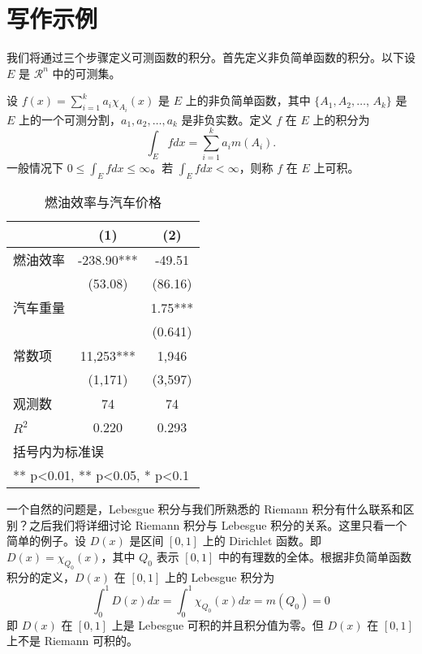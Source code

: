 \documentclass[cn,normal,12pt]{../elegantnote}
\begin{document}
\section{写作示例}

我们将通过三个步骤定义可测函数的积分。首先定义非负简单函数的积分。以下设 $E$ 是 $\mathcal{R}^n$ 中的可测集。

\begin{definition}[可积性]
设 $ f(x)=\sum\limits_{i=1}^{k} a_i \chi_{A_i}(x)$ 是 $E$ 上的非负简单函数，其中 $\{A_1,A_2,\ldots$, $A_k\}$ 是 $E$ 上的一个可测分割，$a_1,a_2,\ldots,a_k$ 是非负实数。定义 $f$ 在 $E$ 上的积分为
\begin{equation}
   \label{inter}
   \int_{E} f dx = \sum_{i=1}^k a_i m(A_i).
\end{equation}
一般情况下 $0 \leq \int_{E} f dx \leq \infty$。若 $\int_{E} f dx < \infty$，则称 $f$ 在 $E$ 上可积。
\end{definition}

\begin{table}[htbp]
  \small
  \centering
  \caption{燃油效率与汽车价格}
    \begin{tabular}{lcc}
    \toprule
                    &       (1)         &        (2)      \\
    \midrule
    燃油效率        &    -238.90***     &      -49.51     \\
                    &     (53.08)       &      (86.16)    \\
    汽车重量        &                   &        1.75***  \\
                    &                   &       (0.641)   \\
    常数项          &  11,253***        &    1,946       \\
                    &  (1,171)          &   (3,597)      \\
    观测数          &      74           &       74        \\
    $R^2$           &       0.220       &        0.293    \\
    \bottomrule
    \multicolumn{3}{l}{\scriptsize 括号内为标准误} \\
    \multicolumn{3}{l}{\scriptsize *** p<0.01, ** p<0.05, * p<0.1} \\
    \end{tabular}%
  \label{tab:reg}%
\end{table}%

一个自然的问题是，Lebesgue 积分与我们所熟悉的 Riemann 积分有什么联系和区别？之后我们将详细讨论 Riemann 积分与 Lebesgue 积分的关系。这里只看一个简单的例子。设 $D(x)$ 是区间 $[0,1]$ 上的 Dirichlet 函数。即 $D(x)=\chi_{Q_0}(x)$，其中 $Q_0$ 表示 $[0,1]$ 中的有理数的全体。根据非负简单函数积分的定义，$D(x)$ 在 $[0,1]$ 上的 Lebesgue 积分为
\begin{equation}
   \label{inter2}
   \int_0^1 D(x)dx = \int_0^1 \chi_{Q_0} (x) dx = m(Q_0) = 0
\end{equation}
即 $D(x)$ 在 $[0,1]$ 上是 Lebesgue 可积的并且积分值为零。但 $D(x)$ 在 $[0,1]$ 上不是 Riemann 可积的。
\end{document}
